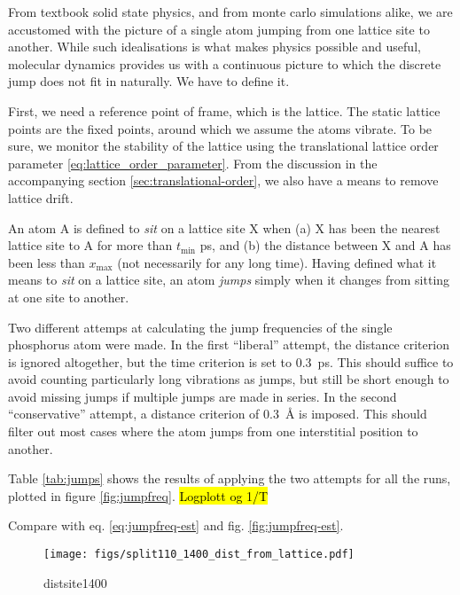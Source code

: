 \documentclass[11pt,bibliography=totoc,index=totoc]{scrbook}   %
\newcommand{\comment}[1]{\hl{#1}}
\begin{document}
From textbook solid state physics, and from monte carlo simulations alike, we are accustomed with the picture of a single atom jumping from one lattice site to another. 
While such idealisations is what makes physics possible and useful, molecular dynamics provides us with a continuous picture to which the discrete jump does not fit in naturally. 
We have to define it.

First, we need a reference point of frame, which is the lattice. The static lattice points are the fixed points, around which we assume the atoms vibrate.
To be sure, we monitor the stability of the lattice using the translational lattice order parameter \eqref{eq:lattice_order_parameter}. From the discussion in the accompanying section \ref{sec:translational-order}, we also have a means to remove lattice drift.

An atom A is defined to \emph{sit} on a lattice site X when (a) X has been the nearest lattice site to A for more than $t_{\text{min}}$ ps, and (b) the distance between X and A has been less than $x_{\text{max}}$ (not necessarily for any long time). Having defined what it means to \emph{sit} on a lattice site, an atom \emph{jumps} simply when it changes from sitting at one site to another.

Two different attemps at calculating the jump frequencies of the single phosphorus atom were made.
In the first ``liberal'' attempt, the distance criterion is ignored altogether, but the time criterion is set to 0.3~ps.
This should suffice to avoid counting particularly long vibrations as jumps, but still be short enough to avoid missing jumps if multiple jumps are made in series. 
In the second ``conservative'' attempt, a distance criterion of 0.3~Å is imposed. This should filter out most cases where the atom jumps from one interstitial position to another. 

Table \ref{tab:jumps} shows the results of applying the two attempts for all the runs, plotted in figure \ref{fig:jumpfreq}. \comment{Logplott og 1/T}

Compare with eq. \eqref{eq:jumpfreq-est} and fig. \ref{fig:jumpfreq-est}.

\begin{figure}[htbp]
  \centering
  \texttt{[image: figs/split110\_1400\_dist\_from\_lattice.pdf]}
  \caption{distsite1400}
  \label{fig:distsite1400}
\end{figure}
\end{document}
